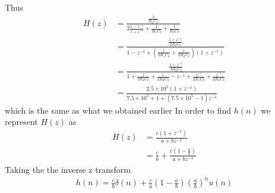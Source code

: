 \documentclass[journal,12pt,twocolumn]{IEEEtran}
\providecommand{\brak}[1]{\ensuremath{\left(#1\right)}}
\numberwithin{equation}{section}
\numberwithin{figure}{section}
\renewcommand\thesection{\arabic{section}}
\begin{document}
\begin{enumerate}[label=\thesection.\arabic*,ref=\thesection.\theenumi]
			Thus
			\begin{align}
				H(z) &= \frac{\frac{1}{R_2C_0}}{2\frac{1-z^{-1}}{1+z^{-1}} + \frac{1}{R_1C_0} + \frac{1}{R_2C_0}} \\
				&= \frac{\frac{1 + z^{-1}}{2R_2C_0}}{1-z^{-1}	 + \brak{\frac{1}{2R_1C_0} + \frac{1}{2R_2C_0}}(1 + z^{-1})} \\
				&= \frac{\frac{1 + z^{-1}}{2R_2C_0}}{1 + \frac{1}{2R_1C_0} + \frac{1}{2R_2C_0} - z^{-1} + \frac{z^{-1}}{2R_1C_0} + \frac{z^{-1}}{2R_2C_0}} \\
				&= \frac{2.5\times10^5 (1+z^{-1})}{7.5\times10^5 + 1 + (7.5\times10^5 - 1)z^{-1}}
			\end{align}
			which is the same as what we obtained earlier
			In order to find $h(n)$ we represent $H(z)$ as \\
			\begin{align}
				H(z) &= \frac{c(1+z^{-1})}{a+bz^{-1}}\\
				&= \frac{c}{b} + \frac{c(1-\frac{a}{b})}{a+bz^{-1}}
			\end{align}
			Taking the the inverse z transform\\
			\begin{align}
				h(n) = \frac{c}{b}\delta(n)+\frac{c}{a}\brak{1-\frac{a}{b}}\brak{\frac{a}{b}}^nu(n)
			\end{align}
	\end{enumerate}
\end{document}
